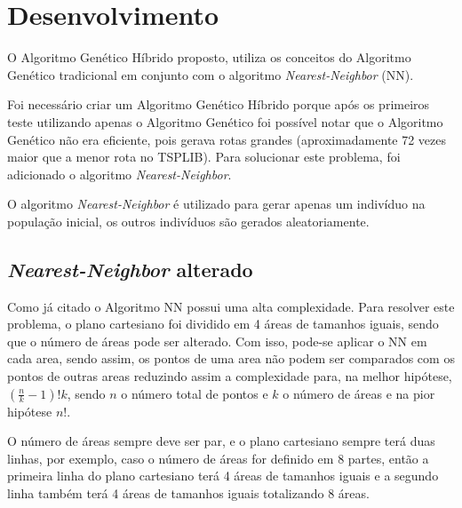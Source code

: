 \documentclass{abnt}
\begin{document}
		\chapter{Desenvolvimento}
		
		O Algoritmo Genético Híbrido proposto, utiliza os conceitos do Algoritmo Genético tradicional em conjunto com o algoritmo  \textit{Nearest-Neighbor} (NN).

		Foi necessário criar um Algoritmo Genético Híbrido porque após os primeiros teste utilizando apenas o Algoritmo Genético foi possível notar que o Algoritmo Genético não era eficiente, pois gerava rotas grandes (aproximadamente 72 vezes maior que a menor rota no TSPLIB). Para solucionar este problema, foi adicionado o algoritmo \textit{Nearest-Neighbor}. 

		O algoritmo \textit{Nearest-Neighbor} é utilizado para gerar apenas um indivíduo na população inicial, os outros indivíduos são gerados aleatoriamente.
		
		\section {\textit{Nearest-Neighbor} alterado}

		Como já citado o Algoritmo NN possui uma alta complexidade. Para resolver este problema, o plano cartesiano foi dividido em 4 áreas de tamanhos iguais, sendo que o número de áreas pode ser alterado. 
		Com isso, pode-se aplicar o NN em cada area, sendo assim, os pontos de uma area não podem ser comparados com os pontos de outras areas reduzindo assim a complexidade para, na melhor hipótese, $(\frac{n}{k}-1)!k$, sendo $n$ o número total de pontos e $k$ o número de áreas e na pior hipótese $n!$. 
		
		O número de áreas sempre deve ser par, e o plano cartesiano sempre terá duas linhas, por exemplo, caso o número de áreas for definido em 8 partes, então a primeira linha do plano cartesiano terá 4 áreas de tamanhos iguais e a segundo linha também terá 4 áreas de tamanhos iguais totalizando 8 áreas.
		
\end{document}
